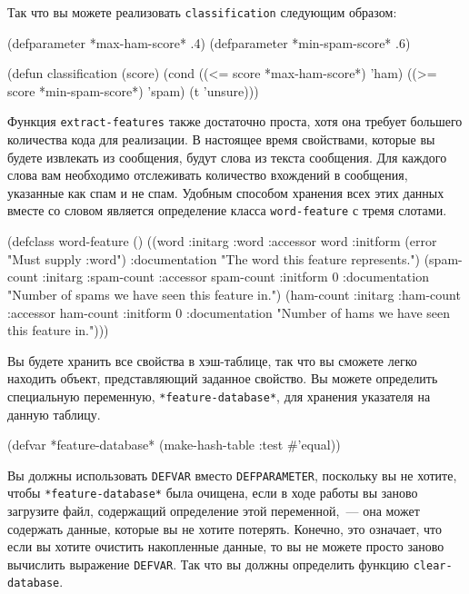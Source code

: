 Так что вы можете реализовать \lstinline{classification} следующим образом:

\begin{myverb}
(defparameter *max-ham-score* .4)
(defparameter *min-spam-score* .6)

(defun classification (score)
  (cond
    ((<= score *max-ham-score*) 'ham)
    ((>= score *min-spam-score*) 'spam)
    (t 'unsure)))
\end{myverb}

Функция \lstinline{extract-features} также достаточно проста, хотя она требует большего
количества кода для реализации.  В настоящее время свойствами, которые вы будете
извлекать из сообщения, будут слова из текста сообщения.  Для каждого слова вам необходимо
отслеживать количество вхождений в сообщения, указанные как спам и не спам.  Удобным
способом хранения всех этих данных вместе со словом является определение класса
\lstinline{word-feature} с тремя слотами.

\begin{myverb}
(defclass word-feature ()
  ((word       
    :initarg :word
    :accessor word
    :initform (error "Must supply :word")
    :documentation "The word this feature represents.")
   (spam-count
    :initarg :spam-count
    :accessor spam-count
    :initform 0
    :documentation "Number of spams we have seen this feature in.")
   (ham-count
    :initarg :ham-count
    :accessor ham-count
    :initform 0
    :documentation "Number of hams we have seen this feature in.")))
\end{myverb}

Вы будете хранить все свойства в хэш-таблице, так что вы сможете легко находить объект,
представляющий заданное свойство.  Вы можете определить специальную переменную,
\lstinline{*feature-database*}, для хранения указателя на данную таблицу.

\begin{myverb}
(defvar *feature-database* (make-hash-table :test #'equal))
\end{myverb}

Вы должны использовать \lstinline{DEFVAR} вместо \lstinline{DEFPARAMETER}, поскольку вы не хотите,
чтобы \lstinline{*feature-database*} была очищена, если в ходе работы вы заново загрузите файл,
содержащий определение этой переменной,~--- она может содержать данные, которые вы не
хотите потерять.  Конечно, это означает, что если вы хотите очистить накопленные данные,
то вы не можете просто заново вычислить выражение \lstinline{DEFVAR}.  Так что вы должны
определить функцию \lstinline{clear-database}.


